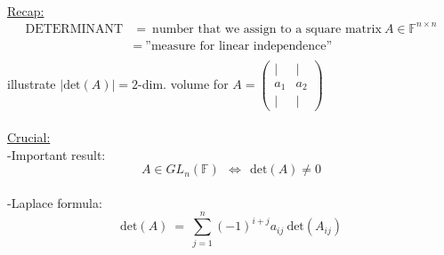 \begin{frame}
	~\\
	{\blank
		\underline{Recap:}
		\begin{align*}
		\text{DETERMINANT}&=~\text{number that we assign to a square matrix}~A\in\mathbb{F}^{n\times n}\\
		&=~\text{''measure for linear independence''}\\
		\end{align*}
		illustrate $|\text{det}(A)|=2$-dim. volume for $A=\begin{pmatrix}|&|\\a_1&a_2\\|&|\end{pmatrix}$\\
		~\\
		\underline{Crucial:}\\
		-Important result:
		$$
		A\in GL_n(\mathbb{F})~~\Leftrightarrow~~\text{det}(A)\neq 0
		$$\\
		-Laplace formula:
		$$
		\text{det}(A)~=~\sum_{j=1}^{n} (-1)^{i+j} a_{ij} ~\text{det}(A_{ij})
		$$
	}
\end{frame}